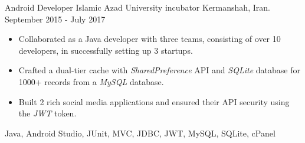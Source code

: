 \begin{experiences}
\experience
{}
{Android Developer }
{Islamic Azad University incubator}
{Kermanshah, Iran. \hspace{60 pt} September 2015 - July 2017}
{}
{
\begin{itemize}
\item Collaborated as a Java developer with three teams, consisting of over 10 developers, in successfully setting up 3 startups.
\item Crafted a dual-tier cache with \emph{SharedPreference} API and \emph{SQLite} database for 1000+ records from a \emph{MySQL} database.
\item Built 2 rich social media applications and ensured their API security using the \emph{JWT} token.
\end{itemize}
}
{Java, Android Studio, JUnit, MVC, JDBC, JWT, MySQL, SQLite, cPanel}

\emptySeparator
\end{experiences}
